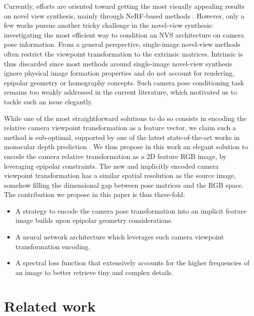 Currently, efforts are oriented toward getting the most visually appealing results on novel view synthesis, mainly through NeRF-based methods \citep{mildenhall2020nerf,wang2021neus,barron2021mip,barron2022mip}. However, only a few works pursue another tricky challenge in the novel-view synthesis: investigating the most efficient way to condition an NVS architecture on camera pose information. From a general perspective, single-image novel-view methods often restrict the viewpoint transformation to the extrinsic matrices. Intrinsic is thus discarded since most methods around single-image novel-view synthesis ignore physical image formation properties and do not account for rendering, epipolar geometry or homography concepts. Such camera pose conditioning task remains too weakly addressed in the current literature, which motivated us to tackle such an issue elegantly.

While one of the most straightforward solutions to do so consists in encoding the relative camera viewpoint transformation as a feature vector, we claim such a method is sub-optimal, supported by one of the latest state-of-the-art works in monocular depth prediction \citep{zhao2021camera}. We thus propose in this work an elegant solution to encode the camera relative transformation as a 2D feature RGB image, by leveraging epipolar constraints. The new and implicitly encoded camera viewpoint transformation has a similar spatial resolution as the source image, somehow filling the dimensional gap between pose matrices and the RGB space. The contribution we propose in this paper is thus three-fold: 
\begin{itemize}
	\item A strategy to encode the camera pose transformation into an implicit feature image builds upon epipolar geometry considerations. 
	\item A neural network architecture which leverages such camera viewpoint transformation encoding. 
	\item A spectral loss function that extensively accounts for the higher frequencies of an image to better retrieve tiny and complex details.
\end{itemize}

\section{Related work}

